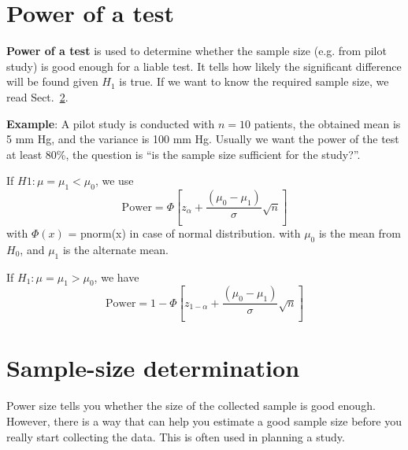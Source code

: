 \section{Power of a test}
\label{sec:power-test}

{\bf Power of a test} is used to determine whether the sample size
(e.g. from pilot study) is good enough for a liable test. It tells how
likely the significant difference will be found given $H_1$ is
true. If we want to know the required sample size, we read
Sect.~\ref{sec:sample-size-determ}.



{\bf Example}: A pilot study is conducted with $n=10$ patients, the
obtained mean is 5 mm Hg, and the variance is 100 mm Hg. Usually we
want the power of the test at least 80\%, the question is ``is the
sample size sufficient for the study?''.  

If $H1: \mu =\mu_1 < \mu_0$, we use
\begin{equation}
  \label{eq:69}
  \text{Power} = \Phi[z_\alpha + \frac{(\mu_0-\mu_1)}{\sigma}\sqrt{n}]
\end{equation}
with $\Phi(x)$ = pnorm(x) in case of normal distribution.  with
$\mu_0$ is the mean from $H_0$, and $\mu_1$ is the alternate mean.

If $H_1: \mu = \mu_1 > \mu_0$, we have
\begin{equation}
  \label{eq:70}
  \text{Power} = 1 - \Phi[z_{1-\alpha} + \frac{(\mu_0-\mu_1)}{\sigma}\sqrt{n}]
\end{equation}

\section{Sample-size determination}
\label{sec:sample-size-determ}

Power size tells you whether the size of the collected sample is good
enough. However, there is a way that can help you estimate a good
sample size before you really start collecting the data.  This is
often used in planning a study.

